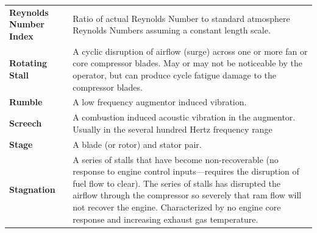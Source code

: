 \documentclass[
]{book}
\begin{document}
\begin{longtable}[]{@{}ll@{}}
\begin{minipage}[t]{0.24\columnwidth}
\textbf{Reynolds Number Index}\strut
\end{minipage} & \begin{minipage}[t]{0.71\columnwidth}\raggedright
Ratio of actual Reynolds Number to standard atmosphere Reynolds Numbers assuming a constant length scale.\strut
\end{minipage}\tabularnewline
\begin{minipage}[t]{0.24\columnwidth}\raggedright
\textbf{Rotating Stall}\strut
\end{minipage} & \begin{minipage}[t]{0.71\columnwidth}\raggedright
A cyclic disruption of airflow (surge) across one or more fan or core compressor blades. May or may not be noticeable by the operator, but can produce cycle fatigue damage to the compressor blades.\strut
\end{minipage}\tabularnewline
\begin{minipage}[t]{0.24\columnwidth}\raggedright
\textbf{Rumble}\strut
\end{minipage} & \begin{minipage}[t]{0.71\columnwidth}\raggedright
A low frequency augmentor induced vibration.\strut
\end{minipage}\tabularnewline
\begin{minipage}[t]{0.24\columnwidth}\raggedright
\textbf{Screech}\strut
\end{minipage} & \begin{minipage}[t]{0.71\columnwidth}\raggedright
A combustion induced acoustic vibration in the augmentor. Usually in the several hundred Hertz frequency range\strut
\end{minipage}\tabularnewline
\begin{minipage}[t]{0.24\columnwidth}\raggedright
\textbf{Stage}\strut
\end{minipage} & \begin{minipage}[t]{0.71\columnwidth}\raggedright
A blade (or rotor) and stator pair.\strut
\end{minipage}\tabularnewline
\begin{minipage}[t]{0.24\columnwidth}\raggedright
\textbf{Stagnation}\strut
\end{minipage} & \begin{minipage}[t]{0.71\columnwidth}\raggedright
A series of stalls that have become non-recoverable (no response to engine control inputs---requires the disruption of fuel flow to clear). The series of stalls has disrupted the airflow through the compressor so severely that ram flow will not recover the engine. Characterized by no engine core response and increasing exhaust gas temperature.\strut

\end{minipage}
\end{longtable}
\end{document}
